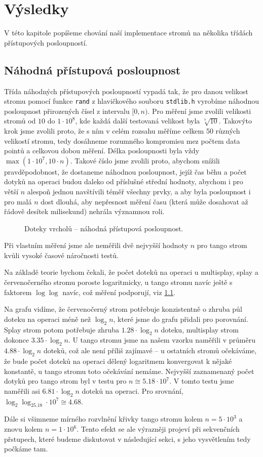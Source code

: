 \chapter{Výsledky}

V této kapitole popíšeme chování naší implementace stromů na několika třídách přístupových posloupností.

\section{Náhodná přístupová posloupnost}

Třída náhodných přístupových posloupností vypadá tak, že pro danou velikost stromu pomocí funkce {\tt rand} z hlavičkového souboru {\tt stdlib.h} vyrobíme náhodnou posloupnost přirozených čísel z intervalu $[0,n)$. Pro měření jsme zvolili velikosti stromů od $10$ do $1\cdot 10^8$, kde každá další testovaná velikost byla $\sqrt[7]{10}$. Takovýto krok jsme zvolili proto, že s ním v celém rozsahu měříme celkem 50 různých velikostí stromu, tedy dosáhneme rozumného kompromisu mez počtem data pointů a celkovou dobou měření. Délka posloupnosti byla vždy $\max(1\cdot10^7, 10\cdot n)$. Takové číslo jsme zvolili proto, abychom snížili pravděpodobnost, že dostaneme náhodnou posloupnost, jejíž čas běhu a počet dotyků na operaci budou daleko od příslušné střední hodnoty, abychom i pro větší $n$ alespoň jednou navštívili téměř všechny prvky, a aby byla posloupnost i pro malá $n$ dost dlouhá, aby nepřesnost měření času (která může dosahovat až řádově desítek milisekund) nehrála významnou roli. 

\def\graphfigure#1#2{
\begin{figure}[h!]
\centering
\caption{#2}
\label{obr:#1}
\end{figure}
}

\graphfigure{touch_r}{Doteky vrcholů -- náhodná přístupová posloupnost.}


Při vlastním měření jsme ale neměřili dvě nejvyšší hodnoty $n$ pro tango strom kvůli vysoké časové náročnosti testů.

Na základě teorie bychom čekali, že počet doteků na operaci u multisplay, splay a červenočerného stromu poroste logaritmicky, u tango stromu navíc ještě s faktorem $\log\log$ navíc, což měření podporují, viz \ref{obr:touch_r}.
\let\oldlog\log
\def\log{\oldlog_2}

Na grafu vidíme, že červenočerný strom potřebuje konzistentně o zhruba
půl doteku na operaci méně než $\log n$, které jsme do grafu přidali pro
porovnání. Splay strom potom potřebuje zhruba $1.28\cdot \log n$ doteku,
multisplay strom dokonce $3.35\cdot \log n$. U tango stromu jsme na našem vzorku naměřili v průměru $4.88\cdot \log n$ doteků, což ale není příliš zajímavé -- u ostatních stromů očekáváme, že bude počet doteků na operaci dělený logaritmem konvergovat k nějaké konstantě, u tango stromu toto očekávání nemáme. Nejvyšší zaznamenaný počet dotyků pro tango strom byl v testu pro $n \cong 5.18\cdot 10^7$. V tomto testu jsme naměřili asi $6.81\cdot \log n$ doteků na operaci. Pro srovnání, $\log\log 5.18\cdot 10^7 \cong 4.68$. 

Dále si všimneme mírného rozvlnění křivky tango stromu kolem $n=5\cdot 10^3$ a znovu kolem $n=1\cdot 10^6$. Tento efekt se ale výrazněji projeví při sekvenčních přstupech, které budeme diskutovat v následující sekci, s jeho vysvětlením tedy počkáme tam. 

